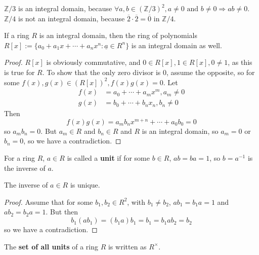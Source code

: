 \begin{example}
	$\mathbb{Z} / 3$ is an integral domain, because $\forall a, b \in {(\mathbb{Z} / 3)}^2, a \ne 0 \text{ and } b \ne 0 \Longrightarrow ab \ne 0$. $\mathbb{Z} / 4$ is not an integral domain, because $\overline{2} \cdot \overline{2} = \overline{0}$ in $\mathbb{Z} / 4$.
\end{example}

\begin{proposition}
	If a ring $R$ is an integral domain, then the ring of polynomials $R[x] := \{ a_0 + a_1 x + \cdots + a_n x^n : \underline{a} \in R^n \}$ is an integral domain as well.
\end{proposition}

\begin{proof}
	$R[x]$ is obviously commutative, and $0 \in R[x], 1 \in R[x], 0 \ne 1$, as this is true for $R$. To show that the only zero divisor is $0$, assume the opposite, so for some $f(x), g(x) \in {(R[x])}^2, f(x) g(x) = 0$. Let
	\[
		\begin{aligned}
			f(x) & = a_0 + \cdots + a_m x^m, a_m \ne 0 \\
			g(x) & = b_0 + \cdots + b_n x_n, b_n \ne 0
		\end{aligned}
	\]
	Then
	\[
		f(x) g(x) = a_m b_n x^{m + n} + \cdots + a_0 b_0 = 0
	\]
	so $a_m b_n = 0$. But $a_m \in R$ and $b_n \in R$ and $R$ is an integral domain, so $a_m = 0$ or $b_n = 0$, so we have a contradiction.
\end{proof}

\begin{definition}
	For a ring $R$, $a \in R$ is called a \textbf{unit} if for some $b \in R$, $ab = ba = 1$, so $b = a^{-1}$ is the inverse of $a$.
\end{definition}

\begin{proposition}
	The inverse of $a \in R$ is unique.
\end{proposition}

\begin{proof}
	Assume that for some $b_1, b_2 \in R^2$, with $b_1 \ne b_2$, $a b_1 = b_1 a = 1$ and $a b_2 = b_2 a = 1$. But then
	\[
		b_1 (a b_1) = (b_1 a) b_1 = b_1 = b_1 a b_2 = b_2
	\]
	so we have a contradiction.
\end{proof}

\begin{definition}
	The \textbf{set of all units} of a ring $R$ is written as $R^{\times}$.
\end{definition}

